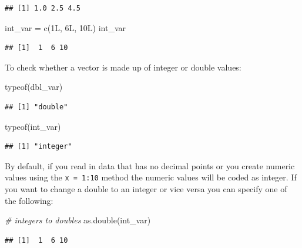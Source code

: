 \documentclass[
]{book}
\newenvironment{Shaded}{\begin{snugshade}}{\end{snugshade}}
\newcommand{\CommentTok}[1]{\textcolor[rgb]{0.56,0.35,0.01}{\textit{#1}}}
\newcommand{\FunctionTok}[1]{\textcolor[rgb]{0.00,0.00,0.00}{#1}}
\newcommand{\NormalTok}[1]{#1}
\newcommand{\OtherTok}[1]{\textcolor[rgb]{0.56,0.35,0.01}{#1}}
\theoremstyle{definition}
\theoremstyle{definition}
\theoremstyle{definition}
\theoremstyle{definition}
\theoremstyle{remark}
\begin{document}
\begin{verbatim}
## [1] 1.0 2.5 4.5
\end{verbatim}

\begin{Shaded}
\begin{Highlighting}[]
\NormalTok{int\_var }\OtherTok{=} \FunctionTok{c}\NormalTok{(1L, 6L, 10L)}
\NormalTok{int\_var}
\end{Highlighting}
\end{Shaded}

\begin{verbatim}
## [1]  1  6 10
\end{verbatim}

To check whether a vector is made up of integer or double values:

\begin{Shaded}
\begin{Highlighting}[]
\FunctionTok{typeof}\NormalTok{(dbl\_var)}
\end{Highlighting}
\end{Shaded}

\begin{verbatim}
## [1] "double"
\end{verbatim}

\begin{Shaded}
\begin{Highlighting}[]
\FunctionTok{typeof}\NormalTok{(int\_var)}
\end{Highlighting}
\end{Shaded}

\begin{verbatim}
## [1] "integer"
\end{verbatim}

By default, if you read in data that has no decimal points or you create numeric values using the \texttt{x\ =\ 1:10} method the numeric values will be coded as integer. If you want to change a double to an integer or vice versa you can specify one of the following:

\begin{Shaded}
\begin{Highlighting}[]
\CommentTok{\# integers to doubles}
\FunctionTok{as.double}\NormalTok{(int\_var)}
\end{Highlighting}
\end{Shaded}

\begin{verbatim}
## [1]  1  6 10
\end{verbatim}
\end{document}
